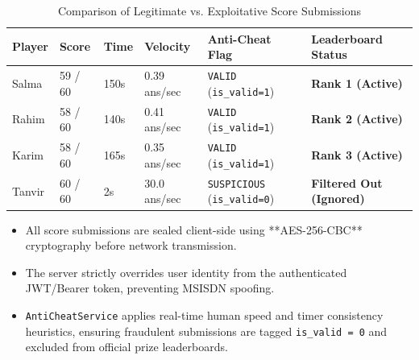 \begin{table}[htbp]
\centering
\small
\begin{tabular}{|l|l|l|l|l|l|}
\hline
\rowcolor{primaryBlue!15}
\textbf{Player} & \textbf{Score} & \textbf{Time} & \textbf{Velocity} & \textbf{Anti-Cheat Flag} & \textbf{Leaderboard Status} \\ \hline
Salma & 59 / 60 & 150s & 0.39 ans/sec & \texttt{VALID} (\texttt{is\_valid=1}) & \textbf{Rank 1 (Active)} \\ \hline
Rahim & 58 / 60 & 140s & 0.41 ans/sec & \texttt{VALID} (\texttt{is\_valid=1}) & \textbf{Rank 2 (Active)} \\ \hline
Karim & 58 / 60 & 165s & 0.35 ans/sec & \texttt{VALID} (\texttt{is\_valid=1}) & \textbf{Rank 3 (Active)} \\ \hline
Tanvir & 60 / 60 & 2s & 30.0 ans/sec & \texttt{SUSPICIOUS} (\texttt{is\_valid=0}) & \textbf{Filtered Out (Ignored)} \\ \hline
\end{tabular}
\caption{Comparison of Legitimate vs. Exploitative Score Submissions}
\end{table}

\begin{tcolorbox}[summarybox, title={Chapter Key Takeaways}]
\begin{itemize}
    \item All score submissions are sealed client-side using **AES-256-CBC** cryptography before network transmission.
    \item The server strictly overrides user identity from the authenticated JWT/Bearer token, preventing MSISDN spoofing.
    \item \texttt{AntiCheatService} applies real-time human speed and timer consistency heuristics, ensuring fraudulent submissions are tagged \texttt{is\_valid = 0} and excluded from official prize leaderboards.
\end{itemize}
\end{tcolorbox}

